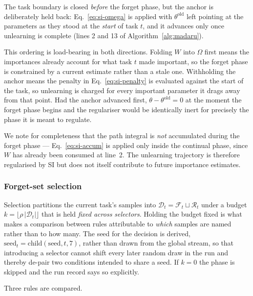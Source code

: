 The task boundary is closed \emph{before} the forget phase, but the anchor is
deliberately held back: Eq.~\eqref{eq:si-omega} is applied with
$\theta^{\text{old}}$ left pointing at the parameters as they stood at the
\emph{start} of task $t$, and it advances only once unlearning is complete
(lines 2 and 13 of Algorithm~\ref{alg:madaru}).

This ordering is load-bearing in both directions. Folding $W$ into $\Omega$
first means the importances already account for what task $t$ made important, so
the forget phase is constrained by a current estimate rather than a stale one.
Withholding the anchor means the penalty in Eq.~\eqref{eq:si-penalty} is
evaluated against the start of the task, so unlearning is charged for every
important parameter it drags away from that point. Had the anchor advanced
first, $\theta - \theta^{\text{old}} = 0$ at the moment the forget phase begins
and the regulariser would be identically inert for precisely the phase it is
meant to regulate.

We note for completeness that the path integral is \emph{not} accumulated during
the forget phase --- Eq.~\eqref{eq:si-accum} is applied only inside the
continual phase, since $W$ has already been consumed at line~2. The unlearning
trajectory is therefore regularised by SI but does not itself contribute to
future importance estimates.

\subsubsection{Forget-set selection}
\label{sec:method:select}

Selection partitions the current task's samples into
$\mathcal{D}_t = \mathcal{F}_t \sqcup \mathcal{R}_t$ under a budget
$k = \lfloor \rho\,|\mathcal{D}_t| \rfloor$ that is held \emph{fixed across
selectors}. Holding the budget fixed is what makes a comparison between rules
attributable to \emph{which} samples are named rather than to how many. The
seed for the decision is derived, $\mathrm{seed}_t = \mathrm{child}(\mathrm{seed}, t, 7)$,
rather than drawn from the global stream, so that introducing a selector cannot
shift every later random draw in the run and thereby de-pair two conditions
intended to share a seed. If $k = 0$ the phase is skipped and the run record
says so explicitly.

Three rules are compared.

